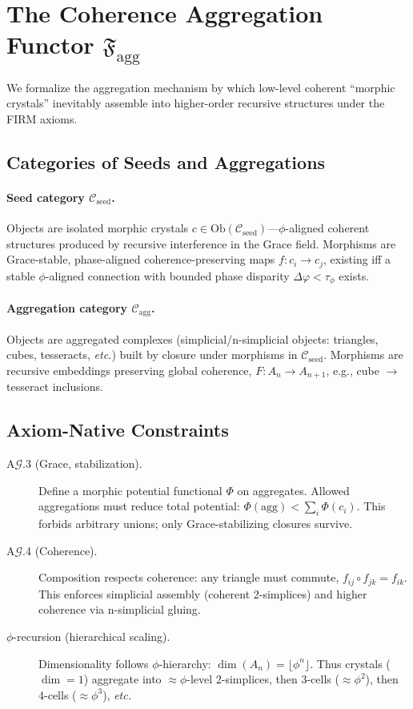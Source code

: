 \section{The Coherence Aggregation Functor \texorpdfstring{$\mathfrak{F}_{\mathrm{agg}}$}{F_aggr}}
\label{sec:coherence_aggregation_functor}

We formalize the aggregation mechanism by which low-level coherent ``morphic crystals''
inevitably assemble into higher-order recursive structures under the FIRM axioms.

\subsection{Categories of Seeds and Aggregations}

\paragraph{Seed category $\mathcal C_{\mathrm{seed}}$.}
Objects are isolated morphic crystals $c\in\mathrm{Ob}(\mathcal C_{\mathrm{seed}})$---$\phi$-aligned coherent
structures produced by recursive interference in the Grace field. Morphisms are
Grace-stable, phase-aligned coherence-preserving maps $f:c_i\to c_j$, existing iff a
stable $\phi$-aligned connection with bounded phase disparity $\Delta\varphi<\tau_\phi$ exists.

\paragraph{Aggregation category $\mathcal C_{\mathrm{agg}}$.}
Objects are aggregated complexes (simplicial/n-simplicial objects: triangles, cubes,
tesseracts, \emph{etc.}) built by closure under morphisms in $\mathcal C_{\mathrm{seed}}$.
Morphisms are recursive embeddings preserving global coherence,
$F: A_n\to A_{n+1}$, e.g., cube $\to$ tesseract inclusions.

\subsection{Axiom-Native Constraints}

\begin{description}
  \item[A$\mathcal G$.3 (Grace, stabilization).] Define a morphic potential functional $\Phi$ on aggregates. Allowed
  aggregations must reduce total potential:
  \(\Phi(\mathrm{agg})<\sum_i\Phi(c_i)\). This forbids arbitrary unions; only Grace-stabilizing closures survive.

  \item[A$\mathcal G$.4 (Coherence).] Composition respects coherence: any triangle must commute,
  $f_{ij}\circ f_{jk}=f_{ik}$. This enforces simplicial assembly (coherent 2-simplices) and
  higher coherence via n-simplicial gluing.

  \item[$\phi$-recursion (hierarchical scaling).] Dimensionality follows $\phi$-hierarchy:
  \(\dim(A_n)=\lfloor \phi^n\rfloor\). Thus crystals ($\dim=1$) aggregate into $\approx\!\phi$-level
  2-simplices, then 3-cells ($\approx\!\phi^2$), then 4-cells ($\approx\!\phi^3$), \emph{etc.}
\end{description}

